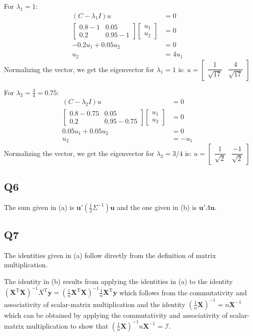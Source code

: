 \documentclass{article}
\newcommand{\I}{\mathcal{I}}
\newcommand{\X}{\mathbf{X}}
\newcommand{\tp}{^{\mathrm T}}
\begin{document}
For $\lambda_1=1$:
\begin{align*}
 (C - \lambda_1 I) u & = 0 \\
\begin{bmatrix} 0.8-1 & 0.05 \\ 0.2 & 0.95-1 \end{bmatrix} \begin{bmatrix} u_1 \\ u_2 \end{bmatrix} &= 0 \\
-0.2u_1 + 0.05u_2 &= 0 \\
u_2 &= 4u_1
\end{align*}
Normalizing the vector, we get the eigenvector for $\lambda_1=1$ is: $u = \begin{bmatrix} \dfrac{1}{\sqrt{17}} & \dfrac{4}{\sqrt{17}} \end{bmatrix}$

For $\lambda_2=\frac{3}{4}=0.75$:
\begin{align*}
 (C - \lambda_2 I) u & = 0 \\
\begin{bmatrix} 0.8-0.75 & 0.05 \\ 0.2 & 0.95-0.75 \end{bmatrix}  \begin{bmatrix} u_1 \\ u_2 \end{bmatrix} &= 0 \\
0.05u_1 + 0.05u_2 &= 0 \\
u_2 &= -u_1
\end{align*}
Normalizing the vector, we get the eigenvector for $\lambda_2=3/4$ is: $u = \begin{bmatrix} \dfrac{1}{\sqrt{2}} & \dfrac{-1}{\sqrt{2}} \end{bmatrix}$

\subsection*{Q6}
The sum given in (a) is $\mathbf u'(\frac12\Sigma^{-1})\mathbf u$ and the one given in (b) is $\mathbf u'\Lambda\mathbf u$.

\subsection*{Q7}
The identities given in (a) follow directly from the definition of matrix multiplication.

The identity in (b) results from applying the identities in (a) to the identity $(\X\tp\X)^{-1}X\tp \mathbf y=(\frac1n\X\tp\X)^{-1}\frac1n\X\tp \mathbf y$ which follows from the commutativity and associativity of scalar-matrix multiplication and the identity $(\frac1n\X)^{-1}=n\X^{-1}$ which can be obtained by applying the commutativity and associativity of scalar-matrix multiplication to show that $(\frac1n\X)^{-1}n\X^{-1}=\I$. 
\end{document}
